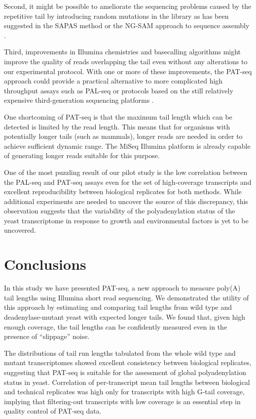 \documentclass[10pt]{article}
\begin{document}
Second, it might be possible to ameliorate the sequencing problems caused by the repetitive tail by introducing random mutations in the library as has been suggested in the SAPAS method \cite{fu11} or the NG-SAM approach to sequence assembly \cite{sipos12}.

Third, improvements in Illumina chemistries and basecalling algorithms might improve the quality of reads overlapping the tail even without any alterations to our experimental protocol. With one or more of these improvements, the PAT-seq approach could provide a practical alternative to more complicated high throughput assays such as PAL-seq or protocols based on the still relatively expensive third-generation sequencing platforms \cite{sharon13}.

One shortcoming of PAT-seq is that the maximum tail length which can be detected is limited by the read length. This means that for organisms with potentially longer tails (such as mammals), longer reads are needed in order to achieve sufficient dynamic range. The MiSeq Illumina platform is already capable of generating longer reads suitable for this purpose.

One of the most puzzling result of our pilot study is the low correlation between the PAL-seq and PAT-seq assays even for the set of high-coverage transcripts and excellent reproducibility between biological replicates for both methods. While additional experiments are needed to uncover the source of this discrepancy, this observation suggests that the variability of the polyadenylation status of the yeast transcriptome in response to growth and environmental factors is yet to be uncovered.

\section*{Conclusions}

In this study we have presented PAT-seq, a new approach to measure poly(A) tail lengths using Illumina short read sequencing. We demonstrated the utility of this approach by estimating and comparing tail lengths from wild type and deadenylase-mutant yeast with expected longer tails. We found that, given high enough coverage, the tail lengths can be confidently measured even in the presence of “slippage” noise.

The distributions of tail run lengths tabulated from the whole wild type and mutant transcriptomes showed excellent consistency between biological replicates, suggesting that PAT-seq is suitable for the assessment of global polyadenylation status in yeast.
Correlation of per-transcript mean tail lengths between biological and technical replicates was high only for transcripts with high G-tail coverage, implying that filtering-out transcripts with low coverage is an essential step in quality control of PAT-seq data.
\end{document}
